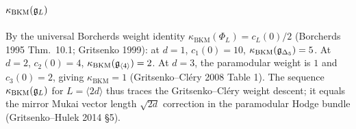 \subsection*{$\kappa_{\mathrm{BKM}}(\mathfrak{g}_L)$}

By the universal Borcherds weight identity $\kappa_{\mathrm{BKM}}(\Phi_L) = c_L(0) / 2$
(Borcherds 1995 Thm.~10.1; Gritsenko 1999): at $d = 1$, $c_1(0) = 10$,
$\kappa_{\mathrm{BKM}}(\mathfrak{g}_{\Delta_5}) = 5$. At $d = 2$, $c_2(0) = 4$,
$\kappa_{\mathrm{BKM}}(\mathfrak{g}_{\langle 4 \rangle}) = 2$. At $d = 3$, the paramodular
weight is $1$ and $c_3(0) = 2$, giving $\kappa_{\mathrm{BKM}} = 1$
(Gritsenko--Cl\'ery 2008 Table 1). The sequence $\kappa_{\mathrm{BKM}}(\mathfrak{g}_L)$
for $L = \langle 2d \rangle$ thus traces the Gritsenko--Cl\'ery weight descent;
it equals the mirror Mukai vector length $\sqrt{2d}$ correction in the paramodular
Hodge bundle (Gritsenko--Hulek 2014 \S5).
